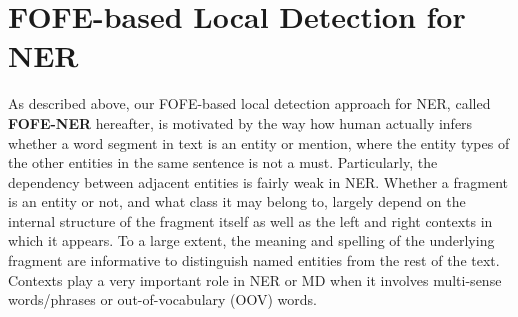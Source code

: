 \documentclass[11pt,a4paper]{article}
\begin{document}

\section{FOFE-based Local Detection for NER}

As described above, our FOFE-based local detection approach for NER, called  \textbf{FOFE-NER} hereafter, 
is motivated by the way how human actually infers whether a word segment in text is an entity or mention, where  
the entity types of the other entities in the same sentence is not a must.
Particularly, the dependency between adjacent entities is fairly weak in NER. 
Whether a fragment is an entity or not, and what class it may belong to, largely depend on
the internal structure of the fragment itself as well as the left and right contexts  in which it appears. 
To a large extent, the meaning and spelling of the underlying fragment 
are informative to distinguish named entities from the rest of the text. 
Contexts play a very important role in NER or MD 
when it involves multi-sense words/phrases or out-of-vocabulary (OOV) words. 
\end{document}
